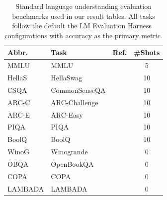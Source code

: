 \begin{table}[htbp]
\centering
\caption{%
Standard language understanding evaluation benchmarks used in our result tables.
All tasks follow the default the LM Evaluation Harness~\citep{eval-harness} configurations
with accuracy as the primary metric.%
}
\label{tab:eval_settings_general}
\scriptsize
\setlength{\tabcolsep}{3pt}
\begin{tabular}{@{}l l l c@{}}
\toprule
\textbf{Abbr.} & \textbf{Task} & \textbf{Ref.} & \textbf{\#Shots} \\
\midrule
MMLU   & MMLU          & \citep{hendrycks2020measuring}  & 5  \\
HellaS & HellaSwag     & \citep{zellers2019hellaswag}    & 10 \\
CSQA   & CommonSenseQA & \citep{talmor2019commonsenseqa} & 10 \\
ARC-C  & ARC-Challenge & \citep{clark2018think}          & 10 \\
ARC-E  & ARC-Easy      & \citep{clark2018think}          & 10 \\
PIQA   & PIQA          & \citep{bisk2020piqa}            & 10 \\
BoolQ  & BoolQ         & \citep{clark2019boolq}          & 10 \\
WinoG  & Winogrande    & \citep{sakaguchi2020winogrande} & 0  \\
OBQA   & OpenBookQA    & \citep{mihaylov2018openbookqa}  & 0  \\
COPA   & COPA          & \citep{copa}                    & 0  \\
LAMBADA & LAMBADA      & \citep{paperno2016lambada}      & 0  \\
\bottomrule
\end{tabular}
\end{table}
